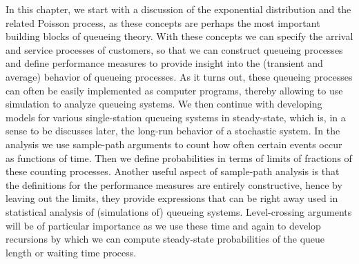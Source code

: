 In this chapter, we start with a discussion of the exponential
distribution and the related Poisson process, as these concepts are
perhaps the most important building blocks of queueing theory. With
these concepts we can specify the arrival and service processes of
customers, so that we can construct queueing processes and define
performance measures to provide insight into the (transient and
average) behavior of queueing processes. As it turns out, these
queueing processes can often be easily implemented as computer programs, thereby
allowing to use simulation to analyze queueing systems. We then
continue with developing models for various single-station queueing
systems in steady-state, which is, in a sense to be discusses later,
the long-run behavior of a stochastic system. In the analysis we use
sample-path arguments to count how often certain events occur as
functions of time. Then we define probabilities in terms of limits of
fractions of these counting processes. Another useful aspect of
sample-path analysis is that the definitions for the performance
measures are entirely constructive, hence by leaving out the limits,
they provide expressions that can be right away used in statistical
analysis of (simulations of) queueing systems. Level-crossing
arguments will be of particular importance as we use these time and
again to develop recursions by which we can compute steady-state
probabilities of the queue length or waiting time process.


